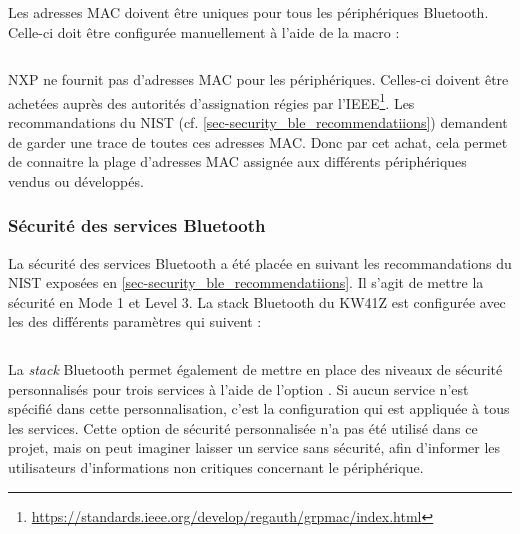 Les adresses MAC doivent être uniques pour tous les périphériques Bluetooth. Celle-ci doit être configurée manuellement à l'aide de la macro  : 

\begin{tcolorbox}
  [top=-1mm, bottom=-3mm, left=0mm, right=0mm, enhanced,breakable,
  attach boxed title to top center={yshift=-3mm,yshifttext=-1mm},colback=LightGray,colframe=DarkGray,
  colbacktitle=DarkGray, fonttitle=\footnotesize\bfseries,boxed title style={size=small,colframe=DarkGray},
  title=\path{app_preinclude.h} ]
\inputminted[firstline=155,lastline=155,bgcolor=LightGray,fontsize=\scriptsize,breaklines,linenos]{C}{SourceCode/app_preinclude.h}
\end{tcolorbox}

NXP ne fournit pas d'adresses MAC pour les périphériques. Celles-ci doivent être achetées auprès des autorités d'assignation régies par l'IEEE\footnote{\url{https://standards.ieee.org/develop/regauth/grpmac/index.html}}. Les recommandations du NIST (cf. \cref{sec-security_ble_recommendatiions}) demandent de garder une trace de toutes ces adresses MAC. Donc par cet achat, cela permet de connaitre la plage d'adresses MAC assignée aux différents périphériques vendus ou développés.

\subsubsection{Sécurité des services Bluetooth}

La sécurité des services Bluetooth a été placée en suivant les recommandations du NIST exposées en \cref{sec-security_ble_recommendatiions}. Il s'agit de mettre la sécurité en Mode 1 et Level 3. La stack Bluetooth du KW41Z est configurée avec les des différents paramètres qui suivent : 

\newpage
\begin{tcolorbox}
  [top=-1mm, bottom=-3mm, left=0mm, right=0mm, enhanced,breakable,
  attach boxed title to top center={yshift=-3mm,yshifttext=-1mm},colback=LightGray,colframe=DarkGray,
  colbacktitle=DarkGray, fonttitle=\footnotesize\bfseries,boxed title style={size=small,colframe=DarkGray},
  title=\path{app_config.c} ]
\inputminted[firstline=166,lastline=181,bgcolor=LightGray,fontsize=\scriptsize,breaklines,linenos]{C}{SourceCode/app_config.c}
\end{tcolorbox}

La \textit{stack} Bluetooth permet également de mettre en place des niveaux de sécurité personnalisés pour trois services à l'aide de l'option . Si aucun service n'est spécifié dans cette personnalisation, c'est la configuration  qui est appliquée à tous les services. Cette option de sécurité personnalisée n'a pas été utilisé dans ce projet, mais on peut imaginer laisser un service sans sécurité, afin d'informer les utilisateurs d'informations non critiques concernant le périphérique.


